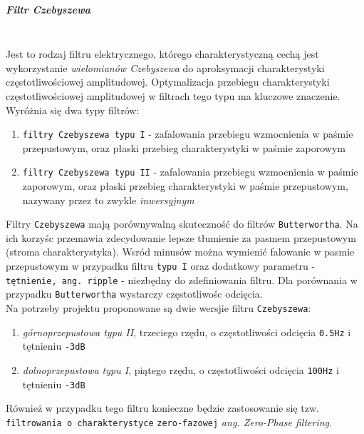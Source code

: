 \documentclass[a4paper, 11pt]{article}
\begin{document}
\subparagraph{Filtr Czebyszewa} 
\mbox{} \\
Jest to rodzaj filtru elektrycznego, którego charakterystyczną cechą jest wykorzystanie \textit{wielomianów Czebyszewa} do aproksymacji charakterystyki częstotliwościowej amplitudowej. Optymalizacja przebiegu charakterystyki częstotliwościowej amplitudowej w filtrach tego typu ma kluczowe znaczenie.\\
Wyróżnia się dwa typy filtrów:
\begin{enumerate}
\item \verb|filtry Czebyszewa typu I| - zafalowania przebiegu wzmocnienia w paśmie przepustowym, oraz płaski przebieg charakterystyki w paśmie zaporowym
\item \verb|filtry Czebyszewa typu II| - zafalowania przebiegu wzmocnienia w paśmie zaporowym, oraz płaski przebieg charakterystyki w paśmie przepustowym, nazywany przez to zwykle \textit{inwersyjnym}
\end{enumerate}
Filtry \verb|Czebyszewa| mają porównywalną skuteczność do filtrów \verb|Butterwortha|. Na ich korzyśc przemawia zdecydowanie lepsze tłumienie za pasmem przepustowym (stroma charakterystyka). Wsród minusów można wymienić falowanie w pasmie przepustowym w przypadku filtru \verb|typu I| oraz dodatkowy parametru - \verb|tętnienie, ang. ripple| - niezbędny do zdefiniowania filtru. Dla porównania w przypadku \verb|Butterwortha| wystarczy częstotliwośc odcięcia.\\
Na potrzeby projektu proponowane są dwie wersjie filtru \verb|Czebyszewa|:
\begin{enumerate}
\item \textit{górnoprzepustowa typu II}, trzeciego rzędu, o częstotliwości odcięcia \verb|0.5Hz| i tętnieniu \verb|-3dB|
\item \textit{dolnoprzepustowa typu I}, piątego rzędu, o częstotliwości odcięcia \verb|100Hz| i tętnieniu \verb|-3dB|
\end{enumerate}
Również w przypadku tego filtru konieczne będzie zastosowanie się tzw. \verb|filtrowania o charakterystyce| \verb|zero-fazowej| \textit{ang. Zero-Phase filtering}.
\end{document}
